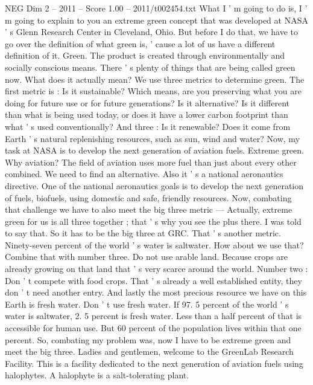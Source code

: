 \begin{textsample}{NEG Dim 2 – 2011 – Score 1.00 – 2011/t002454.txt}  \label{ex:f2_neg_014}
What I ' m going to do is, I ' m going to explain to you an extreme green concept that was developed at NASA ' s Glenn Research Center in Cleveland, Ohio.
But before I do that, we have to go over the definition of what green is, ' cause a lot of us have a different definition of it.
Green.
The product is created through environmentally and socially conscious means.
There ' s plenty of things that are being called green now.
What does it actually mean?
We use three metrics to determine green.
The first metric is : Is it sustainable?
Which means, are you preserving what you are doing for future use or for future generations?
Is it alternative?
Is it different than what is being used today, or does it have a lower carbon footprint than what ' s used conventionally?
And three : Is it renewable?
Does it come from Earth ' s natural replenishing resources, such as sun, wind and water?
Now, my task at NASA is to develop the next generation of aviation fuels.
Extreme green.
Why aviation?
The field of aviation uses more fuel than just about every other combined.
We need to find an alternative.
Also it ' s a national aeronautics directive.
One of the national aeronautics goals is to develop the next generation of fuels, biofuels, using domestic and safe, friendly resources.
Now, combating that challenge we have to also meet the big three metric — Actually, extreme green for us is all three together ; that ' s why you see the plus there.
I was told to say that.
So it has to be the big three at GRC.
That ' s another metric.
Ninety-seven percent of the world ' s water is saltwater.
How about we use that?
Combine that with number three.
Do not use arable land.
Because crops are already growing on that land that ' s very scarce around the world.
Number two : Don ' t compete with food crops.
That ' s already a well established entity, they don ' t need another entry.
And lastly the most precious resource we have on this Earth is fresh water.
Don ' t use fresh water.
If 97. 5 percent of the world ' s water is saltwater, 2. 5 percent is fresh water.
Less than a half percent of that is accessible for human use.
But 60 percent of the population lives within that one percent.
So, combating my problem was, now I have to be extreme green and meet the big three.
Ladies and gentlemen, welcome to the GreenLab Research Facility.
This is a facility dedicated to the next generation of aviation fuels using halophytes.
A halophyte is a salt-tolerating plant.

\end{textsample}
